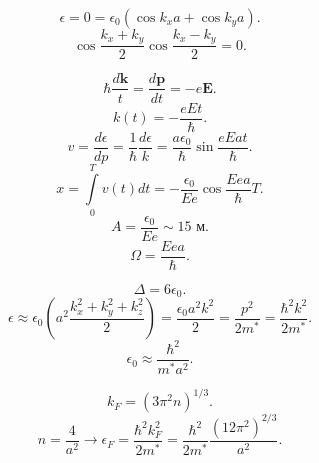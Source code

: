 \documentclass[a4paper]{article}
\begin{document}
\begin{hiProb}[3.35]
\end{hiProb}
\begin{sol}
\[
	\epsilon=0=\epsilon_0 \left( \cos k_x a+ \cos k_y a \right) 
.\] 
\[
\cos \frac{k_x +k_y}{2} \cos \frac{k_x-k_y}{2}=0
.\] 
\end{sol}
\begin{hiProb}[3.37]
\end{hiProb}
\begin{sol}
\[
	\hbar \frac{d\mathbf{k}}{t}= \frac{d \mathbf{p}}{dt}=
	-e \mathbf{E}
.\] 
\[
	k(t)= -\frac{eE t}{\hbar}
.\] 
\[
v= \frac{d\epsilon}{dp}= \frac{1}{\hbar }\frac{d\epsilon }{k}=
\frac{a \epsilon_0}{\hbar }\sin \frac{eE at}{\hbar}
.\] 
\[
	x= \int\limits_{0}^{T} v(t) dt= -\frac{\epsilon_0}{Ee}
	\cos \frac{Ee a}{\hbar}T
.\] 
\[
A=\frac{\epsilon_0}{Ee}\sim 15\text{ м}
.\] 
\[
\Omega= \frac{Eea}{\hbar}
.\] 
\end{sol}
\begin{hiProb}[3.43]
\end{hiProb}
\begin{sol}
\[
\Delta=6\epsilon_0
.\] 
\[
	\epsilon \approx \epsilon_0 \left( a^2 \frac{k_x^2 +k_y^2
	+k_z^2}{2} \right) =\frac{ \epsilon_0 a^2 k^2}{2}=
	\frac{p^2}{2m^*}= \frac{\hbar^2 k^2}{2m^*}
.\] 
\[
\epsilon_0 \approx \frac{\hbar^2}{m^* a^2}
.\] 
\end{sol}
\begin{hiProb}[3.85]
\end{hiProb}
\begin{sol}
\[
	k_F=\left( 3\pi^2 n \right) ^{1 /3}
.\] 
\[
n= \frac{4}{a^2} \to  \epsilon_F = \frac{\hbar^2 k_F^2}{2m^*}
=\frac{\hbar^2}{2m^*} \frac{\left( 12 \pi^2 \right) ^{2 /3}}{a^2}
.\] 
\end{sol}
\end{document}
